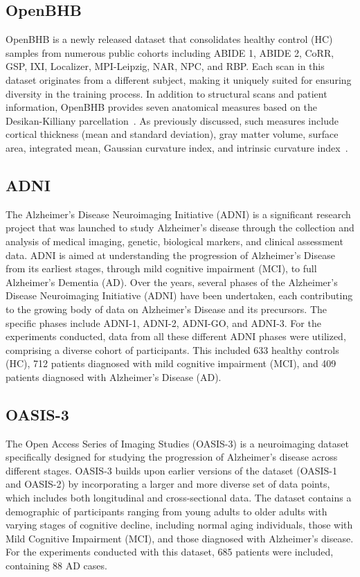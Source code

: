 \subsection{OpenBHB} OpenBHB is a newly released dataset that consolidates
healthy control (HC) samples from numerous public cohorts including ABIDE 1,
ABIDE 2, CoRR, GSP, IXI, Localizer, MPI-Leipzig, NAR, NPC, and RBP. Each scan in
this dataset originates from a different subject, making it uniquely suited for
ensuring diversity in the training process. In addition to structural scans and
patient information, OpenBHB provides seven anatomical measures based
on the Desikan-Killiany parcellation~\cite{desikan_automated_2006}. As
previously discussed, such measures include cortical thickness (mean and
standard deviation), gray matter volume, surface area, integrated mean, Gaussian
curvature index, and intrinsic curvature index~\cite{dufumier_openbhb_2022}. 

\subsection{ADNI}
The Alzheimer's Disease Neuroimaging Initiative (ADNI) is a significant research
project that was launched to study Alzheimer's disease through the collection
and analysis of medical imaging, genetic, biological markers, and clinical
assessment data. ADNI is aimed at understanding the progression of Alzheimer's
Disease from its earliest stages, through mild cognitive impairment (MCI), to
full Alzheimer's Dementia (AD). Over the years, several phases of the
Alzheimer's Disease Neuroimaging Initiative (ADNI) have been undertaken, each
contributing to the growing body of data on Alzheimer's Disease and its
precursors. The specific phases include ADNI-1, ADNI-2, ADNI-GO, and ADNI-3. For
the experiments conducted, data from all these different ADNI phases were
utilized, comprising a diverse cohort of participants. This included 633 healthy
controls (HC), 712 patients diagnosed with mild cognitive impairment (MCI), and
409 patients diagnosed with Alzheimer's Disease (AD).

\subsection{OASIS-3}
The Open Access Series of Imaging Studies (OASIS-3) is a neuroimaging dataset
specifically designed for studying the progression of Alzheimer’s disease across
different stages. OASIS-3 builds upon earlier versions of the dataset (OASIS-1
and OASIS-2) by incorporating a larger and more diverse set of data points,
which includes both longitudinal and cross-sectional data. The dataset contains
a demographic of participants ranging from young adults to older adults with
varying stages of cognitive decline, including normal aging individuals, those
with Mild Cognitive Impairment (MCI), and those diagnosed with Alzheimer’s
disease. For the experiments conducted with this dataset, 685 patients were
included, containing 88 AD cases.

